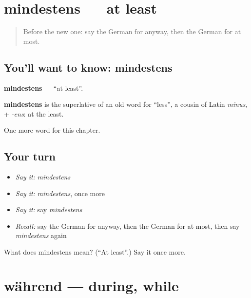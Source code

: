 \section[mindestens]{mindestens — at least}

\label{lesson:GE-C251-mindestens}



\begin{quote}
Before the new one: say the German for anyway, then the German for at most.
\end{quote}

\subsection*{You'll want to know: mindestens}
\textbf{mindestens} — \textquotedblleft{}at least\textquotedblright{}.

\begin{cousinweb}
\textbf{mindestens} is the superlative of an old word for \textquotedblleft{}less\textquotedblright{}, a cousin of Latin \emph{minus}, + \emph{-ens}: at the least.
\end{cousinweb}

\begin{grammarlens}[title={What you've built}]
One more word for this chapter.
\end{grammarlens}

\subsection*{Your turn}
\begin{itemize}
\raggedright
  \item \emph{Say it:} \emph{mindestens}
  \item \emph{Say it:} \emph{mindestens}, once more
  \item \emph{Say it:} say \emph{mindestens}
  \item \emph{Recall:} say the German for anyway, then the German for at most, then say \emph{mindestens} again
\end{itemize}

\begin{tcolorbox}[breakable,colback=teal!4,colframe=teal!35!black,title={Before you move on}]
What does mindestens mean? (\textquotedblleft{}At least\textquotedblright{}.) Say it once more.
\end{tcolorbox}
\section[während]{während — during, while}

